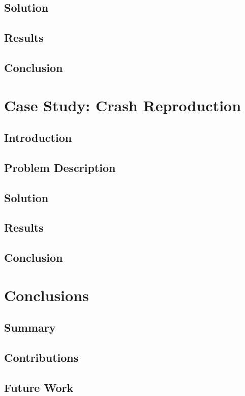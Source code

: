   \section{Solution}
  \label{sec:solution}
    \Blindtext
  \section{Results}
  \label{sec:results}
    \Blindtext
  \section{Conclusion}
  \label{sec:conclusion}
    \Blindtext

\chapter{Case Study: Crash Reproduction}
\label{chap:case_study_crash_reproduction}
  \section{Introduction}
  \label{sec:introduction}
    \Blindtext
  \section{Problem Description}
  \label{sec:problem_description}
    \Blindtext
  \section{Solution}
  \label{sec:solution}
    \Blindtext
  \section{Results}
  \label{sec:results}
    \Blindtext
  \section{Conclusion}
  \label{sec:conclusion}
    \Blindtext

\chapter{Conclusions}
\label{chap:conclusions}
  \section{Summary}
  \label{sec:summary}
    \Blindtext
  \section{Contributions}
  \label{sec:contributions}
    \Blindtext
  \section{Future Work}
  \label{sec:future_work}
    \Blindtext
